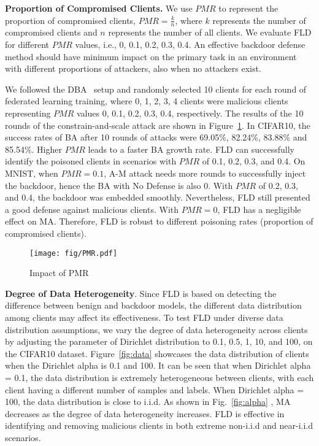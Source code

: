 \textbf{Proportion of Compromised Clients.} We use $PMR$ to represent the proportion of compromised clients, $PMR=\frac{k}{n}$, where $k$ represents the number of compromised clients and $n$ represents the number of all clients. We evaluate FLD for different $PMR$ values, i.e., 0, 0.1, 0.2, 0.3, 0.4. An effective backdoor defense  method should have minimum impact on the primary task in an environment with different proportions of attackers, also when no attackers exist. %

We followed the DBA~\cite{xie2020dba} setup and randomly selected 10 clients for each round of federated learning training, where 0, 1, 2, 3, 4 clients were malicious clients representing $PMR$ values 0, 0.1, 0.2, 0.3, 0.4, respectively. The results of the 10 rounds of the constrain-and-scale attack are shown in Figure~\ref{fig:pmr}. In CIFAR10, the success rates of BA after 10 rounds of attacks were 69.05\%, 82.24\%, 83.88\% and 85.54\%. Higher $PMR$ leads to a faster BA growth rate. FLD can successfully identify the poisoned clients in scenarios with $PMR$ of 0.1, 0.2, 0.3, and 0.4. On MNIST, when $PMR=0.1$, A-M attack needs more rounds to successfully inject the backdoor, hence the BA with No Defense is also 0. With $PMR$ of 0.2, 0.3, and 0.4, the backdoor was embedded smoothly. Nevertheless, FLD still presented a good defense against malicious clients. With $PMR=0$, FLD has a negligible effect on MA. Therefore, FLD is robust to different poisoning rates (proportion of compromised clients).
\begin{figure}[H]
\setlength{\belowcaptionskip}{-6pt} 
\centering
\texttt{[image: fig/PMR.pdf]}
\caption{Impact of PMR}
\label{fig:pmr}
\end{figure}
\noindent\textbf{Degree of Data Heterogeneity}. Since FLD is based on detecting the difference between benign and backdoor models, the different data distribution among clients may affect its effectiveness. To test FLD under diverse data distribution assumptions, we vary the degree of data heterogeneity across clients by adjusting the parameter of Dirichlet distribution to 0.1, 0.5, 1, 10, and 100, on the CIFAR10 dataset. Figure~\ref{fig:data} showcases the data distribution of clients when the Dirichlet alpha is 0.1 and 100. It can be seen that when Dirichlet alpha = 0.1, the data distribution is extremely heterogeneous between clients, with each client having a different number of samples and labels. When Dirichlet alpha = 100, the data distribution is close to i.i.d.
As shown in Fig.~\ref{fig:alpha} , MA decreases as the degree of data heterogeneity increases. FLD is effective in identifying and removing malicious clients in both extreme non-i.i.d and near-i.i.d scenarios.


